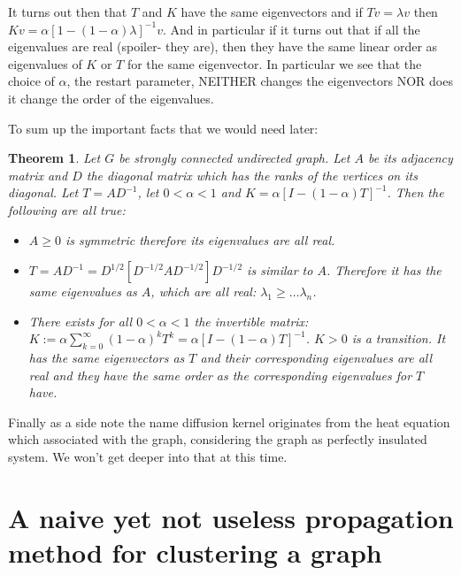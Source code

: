 \documentclass[a4paper,10pt]{article}
\newcommand{\R}{\mathbb{R}}
\newcommand{\gt}{>}
\newcommand{\lt}{<}
\theoremstyle{definition}
\theoremstyle{remark}
\theoremstyle{plain}
\newtheorem{thm}{Theorem}[section]
\begin{document}
It turns out then that $T$ and $K$ have the same eigenvectors and if $Tv=\lambda
v$ then $K v = \alpha [1 - (1 - \alpha) \lambda]^{-1} v$. And in particular if it
turns out that if all the eigenvalues are real (spoiler- they are), then they have
the same linear order as eigenvalues of $K$ or $T$ for the same eigenvector.
In particular we see that the choice of $\alpha$, the restart parameter, NEITHER 
changes the eigenvectors NOR does it change the order of the eigenvalues.

To sum up the important facts that we would need later:

\begin{thm}
\label{thm:AKTcharacteristics}
Let $G$ be strongly connected undirected graph. Let $A$ be its adjacency matrix
and $D$ the diagonal matrix which has the ranks of the vertices on its diagonal.
Let $T = A D^{-1}$, let $0 \lt \alpha \lt 1$ and 
$K = \alpha [I - (1 - \alpha)T]^{-1}$. Then the following are all true:

\begin{itemize}

\item{}
$A \geq 0$ is symmetric therefore its eigenvalues are all real.

\item{}
$T = AD^{-1} = D^{1/2}[D^{-1/2}AD^{-1/2}]D^{-1/2}$ is similar to $A$. Therefore
it has the same eigenvalues as $A$, which are all real:
$\lambda_1 \geq \dots \lambda_n$.

\item{}
There exists for all $0 \lt \alpha \lt 1$ the invertible matrix: 
$K := \alpha \sum_{k=0}^{\infty} (1 - \alpha)^k T^k = \alpha [I - (1 -
\alpha)T]^{-1}$.
$K \gt 0$ is a transition. It has the same eigenvectors as $T$ and their
corresponding eigenvalues are all real and they have the same order as the
corresponding eigenvalues for $T$ have.
\end{itemize}
\end{thm}

Finally as a side note the name diffusion kernel originates from the heat
equation which associated with the graph, considering the graph 
as perfectly insulated system.
We won't get deeper into that at this time.


\section{A naive yet not useless propagation method for clustering a graph}
\end{document}
